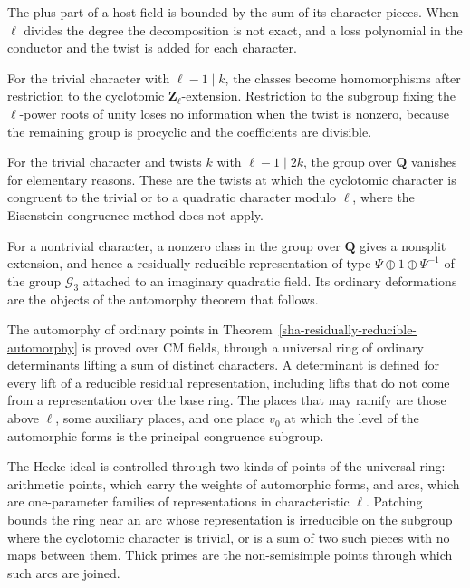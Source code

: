 The plus part of a host field is bounded by the sum of its character pieces. When $\ell$ divides the degree the decomposition is not exact, and a loss polynomial in the conductor and the twist is added for each character.

For the trivial character with $\ell-1\mid k$, the classes become homomorphisms after restriction to the cyclotomic $\mathbf Z_\ell$-extension. Restriction to the subgroup fixing the $\ell$-power roots of unity loses no information when the twist is nonzero, because the remaining group is procyclic and the coefficients are divisible.

For the trivial character and twists $k$ with $\ell-1\mid2k$, the group over $\mathbf Q$ vanishes for elementary reasons. These are the twists at which the cyclotomic character is congruent to the trivial or to a quadratic character modulo $\ell$, where the Eisenstein-congruence method does not apply.

For a nontrivial character, a nonzero class in the group over $\mathbf Q$ gives a nonsplit extension, and hence a residually reducible representation of type $\Psi\oplus1\oplus\Psi^{-1}$ of the group $\mathcal G_3$ attached to an imaginary quadratic field. Its ordinary deformations are the objects of the automorphy theorem that follows.

The automorphy of ordinary points in Theorem~\ref{sha-residually-reducible-automorphy} is proved over CM fields, through a universal ring of ordinary determinants lifting a sum of distinct characters. A determinant is defined for every lift of a reducible residual representation, including lifts that do not come from a representation over the base ring. The places that may ramify are those above $\ell$, some auxiliary places, and one place $v_0$ at which the level of the automorphic forms is the principal congruence subgroup.

The Hecke ideal is controlled through two kinds of points of the universal ring: arithmetic points, which carry the weights of automorphic forms, and arcs, which are one-parameter families of representations in characteristic $\ell$. Patching bounds the ring near an arc whose representation is irreducible on the subgroup where the cyclotomic character is trivial, or is a sum of two such pieces with no maps between them. Thick primes are the non-semisimple points through which such arcs are joined.

